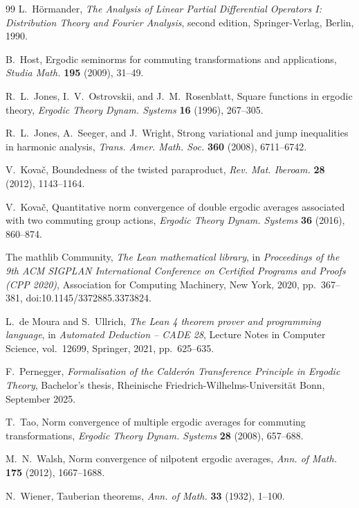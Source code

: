 \documentclass[12pt,reqno]{amsart}
\theoremstyle{plain}
\numberwithin{equation}{section}
\theoremstyle{remark}
\begin{document}
\begin{thebibliography}{99}
L.~H\"ormander,
\emph{The Analysis of Linear Partial Differential Operators I: Distribution Theory and Fourier Analysis},
second edition, Springer-Verlag, Berlin, 1990.

B.~Host,
Ergodic seminorms for commuting transformations and applications,
\emph{Studia Math.} \textbf{195} (2009), 31--49.

R.~L.~Jones, I.~V.~Ostrovskii, and J.~M.~Rosenblatt,
Square functions in ergodic theory,
\emph{Ergodic Theory Dynam. Systems} \textbf{16} (1996), 267--305.

R.~L.~Jones, A.~Seeger, and J.~Wright,
Strong variational and jump inequalities in harmonic analysis,
\emph{Trans. Amer. Math. Soc.} \textbf{360} (2008), 6711--6742.

V.~Kova\v{c},
Boundedness of the twisted paraproduct,
\emph{Rev. Mat. Iberoam.} \textbf{28} (2012), 1143--1164.

V.~Kova\v{c},
Quantitative norm convergence of double ergodic averages associated with two commuting group actions,
\emph{Ergodic Theory Dynam. Systems} \textbf{36} (2016), 860--874.

The mathlib Community,
\emph{The Lean mathematical library},
in \emph{Proceedings of the 9th ACM SIGPLAN International Conference
on Certified Programs and Proofs (CPP 2020)},
Association for Computing Machinery, New York, 2020,
pp.~367--381,
doi:10.1145/3372885.3373824.

L.~de Moura and S.~Ullrich,
\emph{The Lean 4 theorem prover and programming language},
in \emph{Automated Deduction -- CADE 28},
Lecture Notes in Computer Science, vol.~12699,
Springer, 2021, pp.~625--635.

F.~Pernegger,
\emph{Formalisation of the Calder\'on Transference Principle in Ergodic Theory},
Bachelor's thesis, Rheinische Friedrich-Wilhelms-Universit\"at Bonn, September 2025.

T.~Tao,
Norm convergence of multiple ergodic averages for commuting transformations,
\emph{Ergodic Theory Dynam. Systems} \textbf{28} (2008), 657--688.

M.~N.~Walsh,
Norm convergence of nilpotent ergodic averages,
\emph{Ann. of Math.} \textbf{175} (2012), 1667--1688.

N.~Wiener,
Tauberian theorems,
\emph{Ann. of Math.} \textbf{33} (1932), 1--100.
\end{thebibliography}
\end{document}
